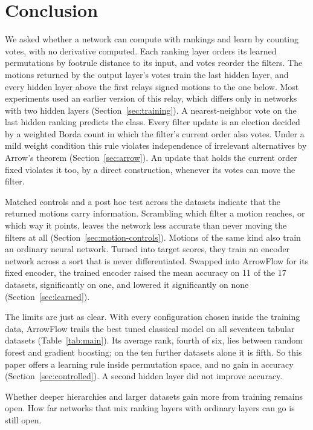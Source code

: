 \section{Conclusion}\label{sec:conclusion}

We asked whether a network can compute with rankings and learn by counting votes, with no derivative computed. Each ranking layer orders its learned permutations by footrule distance to its input, and votes reorder the filters. The motions returned by the output layer's votes train the last hidden layer, and every hidden layer above the first relays signed motions to the one below. Most experiments used an earlier version of this relay, which differs only in networks with two hidden layers (Section~\ref{sec:training}). A nearest-neighbor vote on the last hidden ranking predicts the class. Every filter update is an election decided by a weighted Borda count in which the filter's current order also votes. Under a mild weight condition this rule violates independence of irrelevant alternatives by Arrow's theorem (Section~\ref{sec:arrow}). An update that holds the current order fixed violates it too, by a direct construction, whenever its votes can move the filter.

Matched controls and a post hoc test across the datasets indicate that the returned motions carry information. Scrambling which filter a motion reaches, or which way it points, leaves the network less accurate than never moving the filters at all (Section~\ref{sec:motion-controls}). Motions of the same kind also train an ordinary neural network. Turned into target scores, they train an encoder network across a sort that is never differentiated. Swapped into ArrowFlow for its fixed encoder, the trained encoder raised the mean accuracy on 11 of the 17 datasets, significantly on one, and lowered it significantly on none (Section~\ref{sec:learned}).

The limits are just as clear. With every configuration chosen inside the training data, ArrowFlow trails the best tuned classical model on all seventeen tabular datasets (Table~\ref{tab:main}). Its average rank, fourth of six, lies between random forest and gradient boosting; on the ten further datasets alone it is fifth. So this paper offers a learning rule inside permutation space, and no gain in accuracy (Section~\ref{sec:controlled}). A second hidden layer did not improve accuracy.

Whether deeper hierarchies and larger datasets gain more from training remains open. How far networks that mix ranking layers with ordinary layers can go is still open.
